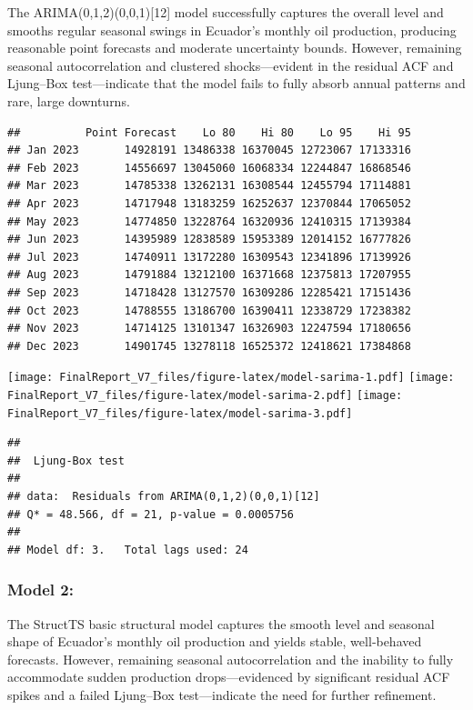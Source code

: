 \documentclass[
]{article}
\begin{document}
The ARIMA(0,1,2)(0,0,1){[}12{]} model successfully captures the overall
level and smooths regular seasonal swings in Ecuador's monthly oil
production, producing reasonable point forecasts and moderate
uncertainty bounds. However, remaining seasonal autocorrelation and
clustered shocks---evident in the residual ACF and Ljung--Box
test---indicate that the model fails to fully absorb annual patterns and
rare, large downturns.

\begin{verbatim}
##          Point Forecast    Lo 80    Hi 80    Lo 95    Hi 95
## Jan 2023       14928191 13486338 16370045 12723067 17133316
## Feb 2023       14556697 13045060 16068334 12244847 16868546
## Mar 2023       14785338 13262131 16308544 12455794 17114881
## Apr 2023       14717948 13183259 16252637 12370844 17065052
## May 2023       14774850 13228764 16320936 12410315 17139384
## Jun 2023       14395989 12838589 15953389 12014152 16777826
## Jul 2023       14740911 13172280 16309543 12341896 17139926
## Aug 2023       14791884 13212100 16371668 12375813 17207955
## Sep 2023       14718428 13127570 16309286 12285421 17151436
## Oct 2023       14788555 13186700 16390411 12338729 17238382
## Nov 2023       14714125 13101347 16326903 12247594 17180656
## Dec 2023       14901745 13278118 16525372 12418621 17384868
\end{verbatim}

\texttt{[image: FinalReport\_V7\_files/figure-latex/model-sarima-1.pdf]}
\texttt{[image: FinalReport\_V7\_files/figure-latex/model-sarima-2.pdf]}
\texttt{[image: FinalReport\_V7\_files/figure-latex/model-sarima-3.pdf]}

\begin{verbatim}
## 
##  Ljung-Box test
## 
## data:  Residuals from ARIMA(0,1,2)(0,0,1)[12]
## Q* = 48.566, df = 21, p-value = 0.0005756
## 
## Model df: 3.   Total lags used: 24
\end{verbatim}

\subsubsection{Model 2:}\label{model-2}

The StructTS basic structural model captures the smooth level and
seasonal shape of Ecuador's monthly oil production and yields stable,
well‐behaved forecasts. However, remaining seasonal autocorrelation and
the inability to fully accommodate sudden production drops---evidenced
by significant residual ACF spikes and a failed Ljung--Box
test---indicate the need for further refinement.
\end{document}

